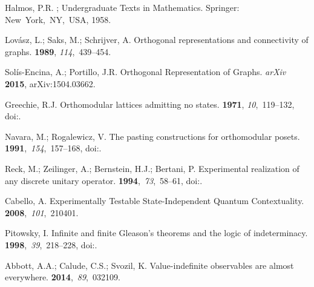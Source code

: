 \begin{thebibliography}{999}
Halmos, P.R.
; Undergraduate Texts in
 Mathematics. Springer: New~York,~NY,~USA, 1958.

Lov\'asz, L.; Saks, M.; Schrijver, A.
\newblock Orthogonal representations and connectivity of graphs.
 {\bf 1989}, {\em
 114},~439--454.

Sol\'is-Encina, A.; Portillo, J.R.
\newblock Orthogonal Representation of Graphs. {\em arXiv} \textbf{2015}, arXiv:1504.03662.

Greechie, R.J.
\newblock Orthomodular lattices admitting no states.
 {\bf 1971}, {\em
 10},~119--132,
\newblock
 doi:{\href{https://doi.org/10.1016/0097-3165(71)90015-X}{}}.

Navara, M.; Rogalewicz, V.
\newblock The pasting constructions for orthomodular posets.
 {\bf 1991},~{\em 154},~157--168,
\newblock
 doi:{\href{https://doi.org/10.1002/mana.19911540113}{}}.

Reck, M.; Zeilinger, A.; Bernstein, H.J.; Bertani, P.
\newblock Experimental realization of any discrete unitary operator.
 {\bf 1994},~{\em 73},~58--61,
\newblock
 doi:{\href{https://doi.org/10.1103/PhysRevLett.73.58}{}}.

Cabello, A.
\newblock Experimentally Testable State-Independent Quantum Contextuality.
 {\bf 2008},~{\em 101},~210401.

Pitowsky, I.
\newblock Infinite and finite {G}leason's theorems and the logic of
 indeterminacy.
 {\bf 1998},~{\em 39},~218--228,
\newblock
 doi:{\href{https://doi.org/10.1063/1.532334}{}}.

Abbott, A.A.; Calude, C.S.; Svozil, K.
\newblock Value-indefinite observables are almost everywhere.
 {\bf 2014},~{\em 89},~032109.


\end{thebibliography}
